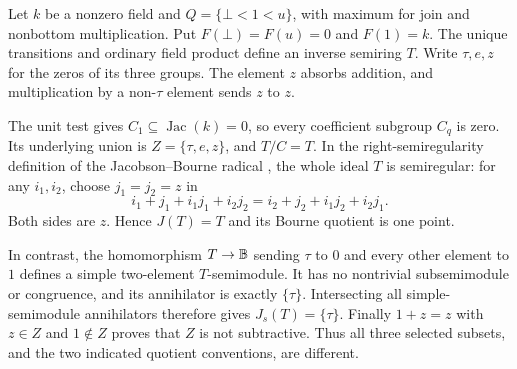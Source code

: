 \begin{example}
\label{ex:jacobson-conventions}
Let $k$ be a nonzero field and $Q=\{\bot<1<u\}$, with maximum
for join and nonbottom multiplication. Put $F(\bot)=F(u)=0$
and $F(1)=k$. The unique transitions and ordinary field product
define an inverse semiring $T$. Write $\tau,e,z$ for the zeros
of its three groups. The element $z$ absorbs addition, and
multiplication by a non-$\tau$ element sends $z$ to $z$.

The unit test gives $C_1\subseteq\operatorname{Jac}(k)=0$,
so every coefficient subgroup $C_q$ is zero. Its underlying
union is $Z=\{\tau,e,z\}$, and $T/C=T$. In the right-semiregularity
definition of the Jacobson--Bourne radical
\cite[p.~14 of the preprint]{KatsovNamRadicals}, the whole ideal
$T$ is semiregular: for any $i_1,i_2$, choose $j_1=j_2=z$ in
\[
 i_1+j_1+i_1j_1+i_2j_2=i_2+j_2+i_1j_2+i_2j_1.
\]
Both sides are $z$. Hence $J(T)=T$ and its Bourne quotient is
one point.

In contrast, the homomorphism $T\to\mathbb B$ sending $\tau$ to $0$
and every other element to $1$ defines a simple two-element
$T$-semimodule. It has no nontrivial subsemimodule or congruence,
and its annihilator is exactly $\{\tau\}$. Intersecting all
simple-semimodule annihilators therefore gives
$J_s(T)=\{\tau\}$. Finally $1+z=z$ with $z\in Z$ and
$1\notin Z$ proves that $Z$ is not subtractive. Thus all three
selected subsets, and the two indicated quotient conventions,
are different.
\end{example}

